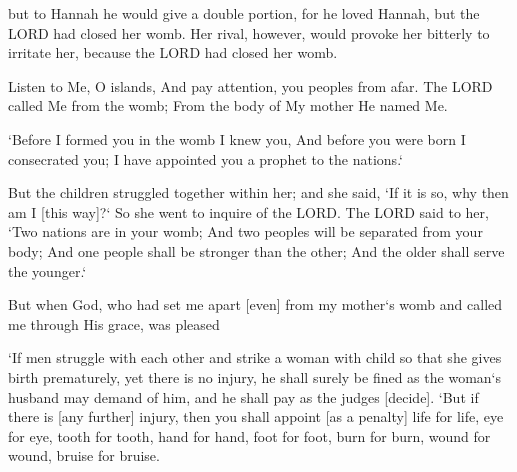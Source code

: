 \begin{scripture}[1 Samuel 1:5-6]
    but to Hannah he would give a double portion, for he loved Hannah, but the LORD had closed her womb.
    Her rival, however, would provoke her bitterly to irritate her, because the LORD had closed her womb.
\end{scripture}

\begin{scripture}[Isaiah 49:1]
    Listen to Me, O islands, And pay attention, you peoples from afar. The LORD called Me from the womb; From the body of My mother He named Me.
\end{scripture}

\begin{scripture}[Jeremiah 1:5]
    `Before I formed you in the womb I knew you, And before you were born I consecrated you; I have appointed you a prophet to the nations.`
\end{scripture}

\begin{scripture}[Genesis 25:22-23]
    But the children struggled together within her; and she said, `If it is so, why then am I [this way]?` So she went to inquire of the LORD.
    The LORD said to her, `Two nations are in your womb; And two peoples will be separated from your body; And one people shall be stronger than the other; And the older shall serve the younger.`
\end{scripture}

\begin{scripture}[Galatians 1:15]
    But when God, who had set me apart [even] from my mother`s womb and called me through His grace, was pleased
\end{scripture}

\begin{scripture}[Exodus 21:22-25]
    `If men struggle with each other and strike a woman with child so that she gives birth prematurely, yet there is no injury, he shall surely be fined as the woman`s husband may demand of him, and he shall pay as the judges [decide].
    `But if there is [any further] injury, then you shall appoint [as a penalty] life for life,
    eye for eye, tooth for tooth, hand for hand, foot for foot,
    burn for burn, wound for wound, bruise for bruise.
\end{scripture}

